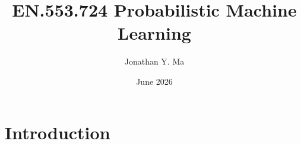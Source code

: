 \documentclass[12pt,oneside]{book}
\title{EN.553.724 Probabilistic Machine Learning}
\author{Jonathan Y. Ma}
\date{June 2026}
\numberwithin{equation}{section}
\theoremstyle{definition}
\theoremstyle{plain}
\theoremstyle{remark}
\begin{document}
\maketitle
\tableofcontents

\newpage
\section{Introduction}
\end{document}
